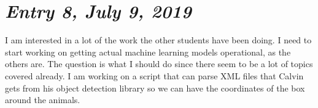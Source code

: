 \documentclass{article}
\begin{document}
\section{\Large \itshape Entry 8, July 9, 2019}
I am interested in a lot of the work the other students have been doing. I need to start working on getting actual machine learning models operational, as the others are. The question is what I should do since there seem to be a lot of topics covered already. I am working on a script that can parse XML files that Calvin gets from his object detection library so we can have the coordinates of the box around the animals.
\end{document}

